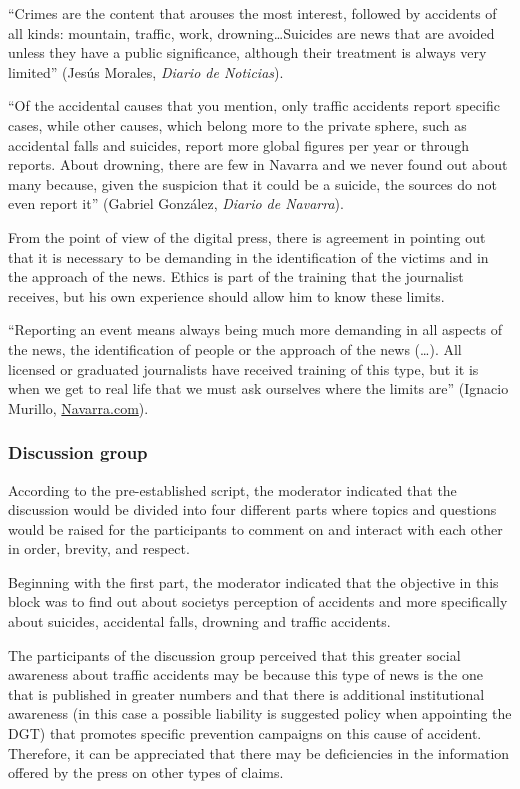 \enquote{Crimes are the content that arouses the most interest, followed by
accidents of all kinds: mountain, traffic, work, drowning\ldots Suicides
are news that are avoided unless they have a public significance,
although their treatment is always very limited} (Jesús Morales,
\emph{Diario de Noticias}).

\enquote{Of the accidental causes that you mention, only traffic accidents
report specific cases, while other causes, which belong more to the
private sphere, such as accidental falls and suicides, report more
global figures per year or through reports. About drowning, there are
few in Navarra and we never found out about many because, given the
suspicion that it could be a suicide, the sources do not even report
it} (Gabriel González, \emph{Diario de Navarra}).

From the point of view of the digital press, there is agreement in
pointing out that it is necessary to be demanding in the identification
of the victims and in the approach of the news. Ethics is part of the
training that the journalist receives, but his own experience should
allow him to know these limits.

\enquote{Reporting an event means always being much more demanding in all
aspects of the news, the identification of people or the approach of the
news (\ldots). All licensed or graduated journalists have received training
of this type, but it is when we get to real life that we must ask
ourselves where the limits are} (Ignacio Murillo, \url{Navarra.com}).

\subsubsection{Discussion group}\label{sub-sub-sec-discussiongroup}

According to the pre-established script, the moderator indicated that
the discussion would be divided into four different parts where topics
and questions would be raised for the participants to comment on and
interact with each other in order, brevity, and respect.

Beginning with the first part, the moderator indicated that the
objective in this block was to find out about society\textquotesingle s
perception of accidents and more specifically about suicides, accidental
falls, drowning and traffic accidents.

The participants of the discussion group perceived that this greater
social awareness about traffic accidents may be because this type of
news is the one that is published in greater numbers and that there is
additional institutional awareness (in this case a possible liability is
suggested policy when appointing the DGT) that promotes specific
prevention campaigns on this cause of accident. Therefore, it can be
appreciated that there may be deficiencies in the information offered by
the press on other types of claims.

